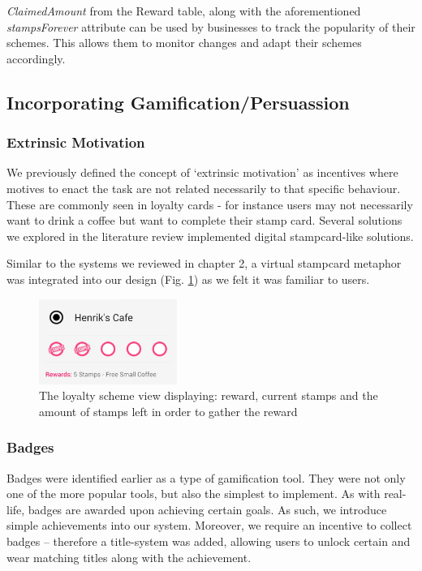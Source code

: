 \emph{ClaimedAmount} from the Reward table, along with the aforementioned \emph{stampsForever} attribute can be used by businesses to track the popularity of their schemes. This allows them to monitor changes and adapt their schemes accordingly.

\newpage
\subsection{Incorporating Gamification/Persuassion}
\subsubsection{Extrinsic Motivation}
We previously defined the concept of `extrinsic motivation' as incentives where motives to enact the task are not related necessarily to that specific behaviour. These are commonly seen in loyalty cards - for instance users may not necessarily want to drink a coffee but want to complete their stamp card. Several solutions we explored in the literature review implemented digital stampcard-like solutions.

Similar to the systems we reviewed in chapter 2, a virtual stampcard metaphor was integrated into our design (Fig. \ref{fig:extrinsicmotivation}) as we felt it was familiar to users.
\begin{figure}[H]
 \centering
  \includegraphics[width=0.40\textwidth]{img/stampcardprogress.jpg}
     \caption{The loyalty scheme view displaying: reward, current stamps and the amount of stamps left in order to gather the reward}
     \label{fig:extrinsicmotivation}
\end{figure}
\subsubsection{Badges}
Badges were identified earlier as a type of gamification tool. They were not only one of the more popular tools, but also the simplest to implement. As with real-life, badges are awarded upon achieving certain goals. As such, we introduce simple achievements into our system. Moreover, we require an incentive to collect badges -- therefore a title-system was added, allowing users to unlock certain and wear matching titles along with the achievement.

